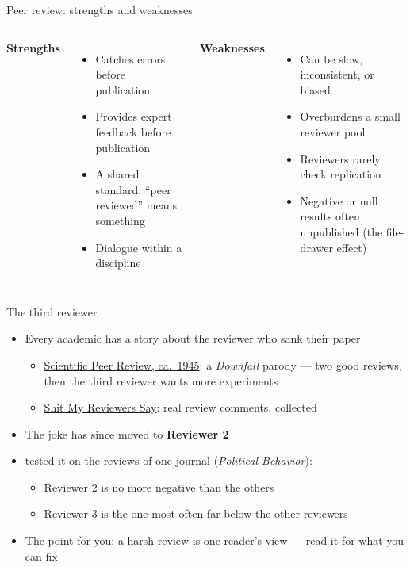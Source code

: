 \documentclass[aspectratio=169]{beamer}
\begin{document}
\begin{frame}{Peer review: strengths and weaknesses}
\begin{columns}[T]
\textbf{Strengths}
\begin{itemize}
  \item Catches errors before publication
  \item Provides expert feedback before publication
  \item A shared standard: ``peer reviewed'' means something
  \item Dialogue within a discipline
\end{itemize}

\textbf{Weaknesses}
\begin{itemize}
  \item Can be slow, inconsistent, or biased
  \item Overburdens a small reviewer pool
  \item Reviewers rarely check replication
  \item Negative or null results often unpublished (the file-drawer effect)
\end{itemize}
\end{columns}
\end{frame}

\begin{frame}{The third reviewer}
\begin{itemize}
  \item Every academic has a story about the reviewer who sank their paper
    \begin{itemize}
    \item \href{https://www.youtube.com/watch?v=-VRBWLpYCPY}{Scientific Peer
        Review, ca.\ 1945}: a \emph{Downfall} parody --- two good reviews,
      then the third reviewer wants more experiments
    \item \href{https://shitmyreviewerssay.tumblr.com/}{Shit My Reviewers Say}:
      real review comments, collected
    \end{itemize}
  \item The joke has since moved to \textbf{Reviewer 2}
  \item \citet{Peterson2020} tested it on the reviews of one journal
    (\emph{Political Behavior}):
    \begin{itemize}
    \item Reviewer 2 is no more negative than the others
    \item Reviewer 3 is the one most often far below the other reviewers
    \end{itemize}
  \item The point for you: a harsh review is one reader's view ---
    read it for what you can fix
\end{itemize}
\end{frame}
\end{document}
